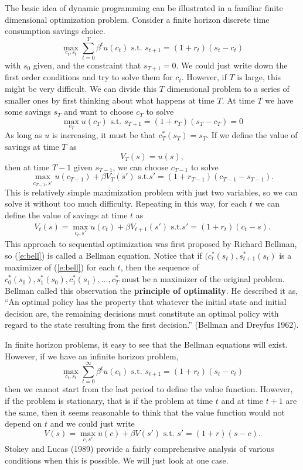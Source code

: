 \documentclass[12pt,reqno]{amsart}
\theoremstyle{definition}
\begin{document}
The basic idea of dynamic programming can be illustrated in a familiar
finite dimensional optimization problem. Consider a finite horizon
discrete time consumption savings choice. 
\[ \max_{c_t,s_t} \sum_{t=0}^T \beta^t u(c_t) \text{ s.t. } s_{t+1} =
(1+r_t) (s_t - c_t) \]
with $s_0$ given, and the constraint that $s_{T+1} = 0$. We could just write down the first order conditions
and try to solve them for $c_t$. However, if $T$ is large, this might
be very difficult. We can divide this $T$ dimensional problem to a
series of smaller ones by first thinking about what happens at time
$T$. At time $T$ we have some savings $s_T$ and want to choose $c_T$
to solve
\[ \max_{c_T} u(c_T) \text{ s.t. } s_{T+1} = (1+r_T)(s_T -c_T) = 0 \]
As long as $u$ is increasing, it must be that $c_T^*(s_T) = s_T$. If
we define the value of savings at time $T$ as
\[ V_T(s) = u(s), \]
then at time $T-1$ given $s_{T-1}$, we can choose $c_{T-1}$ to solve
\[ \max_{c_{T-1},s'} u(c_{T-1}) + \beta V_T(s') \text{ s.t.} s' =
  (1+r_{T-1})(c_{T-1}-s_{T-1}). \]
This is relatively simple maximization problem with just two
variables, so we can solve it without too much difficulty. Repeating
in this way, for each $t$ we can define the value of savings at time
$t$ as
\begin{align} 
  V_t(s) = \max_{c_t,s'} u(c_{t}) + \beta V_{t+1}(s') \text{ s.t.} s' =
  (1+r_{t})(c_{t}-s). \label{e:bell}
\end{align}
This approach to sequential optimization was first proposed by Richard
Bellman, so (\ref{e:bell}) is called a Bellman equation. Notice that
if $(c_t^*(s_t),s_{t+1}^*(s_t)$ is a maximizer of (\ref{e:bell}) for
each $t$, then 
the sequence of $c_0^*(s_0),s_1^*(s_0), c_1^*(s_1), ..., c_T^*$ must
be a maximizer of the original problem. Bellman called this
observation the \textbf{principle of optimality}. He described it as,
``An optimal policy has the property that whatever the initial state
and initial decision are, the remaining decisions must constitute an
optimal policy with regard to the state resulting from the first
decision.'' (Bellman and Dreyfus 1962). 

In finite horizon problems, it easy to see that the
Bellman equations will exist. However, if we have an infinite horizon
problem, 
\[ \max_{c_t,s_t} \sum_{t=0}^\infty \beta^t u(c_t) \text{ s.t. } s_{t+1} =
(1+r_t) (s_t - c_t) \]
then we cannot start from the last period to define the value
function. However, if the problem is stationary, that is if the
problem at time $t$ and at time $t+1$ are the same, then it seems
reasonable to think that the value function would not depend on $t$
and we could just write 
\[ V(s) = \max_{c,s'} u(c) + \beta V(s') \text{ s.t. } s' =
(1+r)(s-c). \]
Stokey and Lucas (1989) provide a fairly comprehensive analysis of
various conditions when this is possible. We will just look at one
case. 
\end{document}

